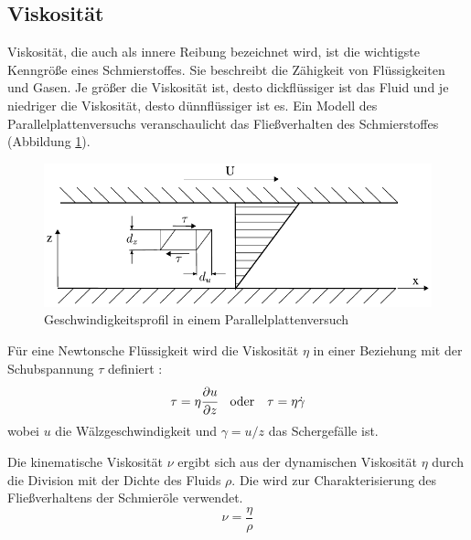 \subsection*{Viskosität}
\label{sub:viskositaet}
Viskosität, die auch als innere Reibung bezeichnet wird, ist die wichtigste Kenngröße eines Schmierstoffes.
Sie beschreibt die Zähigkeit von Flüssigkeiten und Gasen.
Je größer die Viskosität ist, desto dickflüssiger ist das Fluid und je niedriger die Viskosität, desto dünnflüssiger ist es.
Ein Modell des Parallelplattenversuchs veranschaulicht das Fließverhalten des Schmierstoffes (Abbildung \ref{fig:geschwindigkeitsprofil_parallelplattenversuch}).
\begin{figure}[htb]
    \centering
    \includegraphics[]{./images/parallelplattenversuch.pdf}
    \caption{Geschwindigkeitsprofil in einem Parallelplattenversuch\cite{wisniewski_2000}}
    \label{fig:geschwindigkeitsprofil_parallelplattenversuch}
\end{figure}

Für eine Newtonsche Flüssigkeit wird die Viskosität $\eta$ in einer Beziehung mit der Schubspannung $\tau$ definiert \cite{viscosity_wiki}:
\begin{equation}
    \tau = \eta \cfrac{\partial u}{\partial z} \quad \text{oder} \quad \tau = \eta \dot{\gamma}
    \label{eq:viskositaet}
\end{equation}
%
wobei $u$ die Wälzgeschwindigkeit und $\gamma = u/z$ das Schergefälle ist.


Die kinematische Viskosität $\nu$ ergibt sich aus der dynamischen Viskosität $\eta$ durch die Division mit der Dichte des Fluids $\rho$. Die wird zur Charakterisierung des Fließverhaltens der Schmieröle verwendet.
\begin{equation}
    \nu = \frac{\eta}{\rho}
    \label{eq:kinematische_viskotitaet}
\end{equation}

